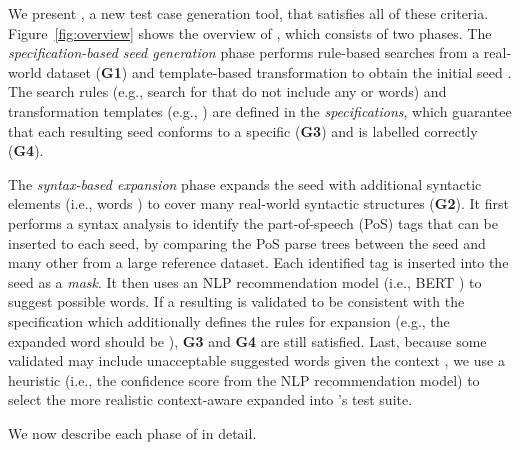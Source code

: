 We present \tool{}, a new \lc test case generation
tool, that satisfies all of these criteria.  
Figure~\ref{fig:overview} shows the overview of \tool{}, which
consists of two phases.  The \emph{specification-based seed
  generation} phase performs rule-based searches from a real-world
dataset ({\bf G1}) and template-based transformation to obtain the
initial seed \sents.  The search rules (e.g., search for \neu
\sents that do not include any \pstv or \ngtv words) and
transformation templates (e.g.,  ) are defined in the \emph{\lc
  specifications}, which guarantee that each resulting seed conforms
to a specific \lc ({\bf G3}) and is labelled
correctly ({\bf G4}).

The \emph{syntax-based \sent expansion} phase expands the seed
\sents with additional syntactic elements (i.e., words
) to cover many real-world
syntactic structures ({\bf G2}). It first performs a syntax analysis
to identify the part-of-speech (PoS) tags that can be inserted to each
seed, by comparing the PoS parse trees between the seed \sent and
many other \sents from a large reference dataset. Each identified
tag is inserted into the seed as a \emph{mask}. It then uses an NLP
recommendation model (i.e., BERT \cite{}) to suggest possible
words. If a resulting \sent is validated to be consistent with the
specification which additionally defines the rules for expansion
(e.g., the expanded word should be \neu), {\bf G3} and {\bf G4} are
still satisfied.  Last, because some validated \sents may include
unacceptable suggested words given the context  , we use a heuristic (i.e., the
confidence score from the NLP recommendation model) to select the more
realistic context-aware expanded \sents into \tool{}'s test suite.

We now describe each phase of \tool{} in detail.


